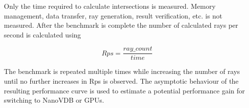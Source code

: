 Only the time required to calculate intersections is measured. Memory management, data transfer, ray generation, result verification, etc. is not measured.
After the benchmark is complete the number of calculated rays per second is calculated using 

\begin{equation}
	Rps = \frac{ray\_count}{time}
\end{equation}

The benchmark is repeated multiple times while increasing the number of rays until no further increases in Rps is observed.
The asymptotic behaviour of the resulting performance curve is used to estimate a potential performance gain for switching to NanoVDB or GPUs.